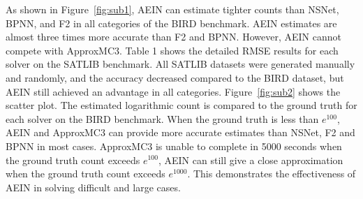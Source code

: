 As shown in Figure~\ref{fig:sub1}, AEIN can estimate tighter counts than NSNet, BPNN, and F2 in all 
categories of the BIRD benchmark. AEIN estimates are almost three times more accurate than F2 and BPNN. 
However, AEIN cannot compete with ApproxMC3.
Table 1 shows the detailed RMSE results for each solver on the SATLIB benchmark. All SATLIB datasets 
were generated manually and randomly, and the accuracy decreased compared to the BIRD dataset, but AEIN 
still achieved an advantage in all categories.
Figure~\ref{fig:sub2} shows the scatter plot. The estimated logarithmic count is compared to the ground 
truth for each solver on the BIRD benchmark. When the ground truth is less than \(e^{100}\), AEIN and 
ApproxMC3 can provide more accurate estimates than NSNet, F2 and BPNN in most cases. ApproxMC3 is unable 
to complete in 5000 seconds when the ground truth count exceeds \(e^{100}\), AEIN can still give a close 
approximation when the ground truth count exceeds \(e^{1000}\). This demonstrates the effectiveness of AEIN 
in solving difficult and large cases.

